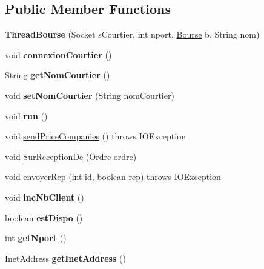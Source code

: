 \subsection*{Public Member Functions}
\begin{DoxyCompactItemize}
\item 
\mbox{\label{classcom_1_1m1sar_1_1_thread_bourse_ac083c16dd85a59f19f3ea1728d32e057}} 
{\bfseries Thread\+Bourse} (Socket s\+Courtier, int nport, \hyperlink{classcom_1_1m1sar_1_1_bourse}{Bourse} b, String nom)
\item 
\mbox{\label{classcom_1_1m1sar_1_1_thread_bourse_ac052e73112ac20e1c2e6fa3f7c9bce94}} 
void {\bfseries connexion\+Courtier} ()
\item 
\mbox{\label{classcom_1_1m1sar_1_1_thread_bourse_adfc535a296af8c294920dadf497a928b}} 
String {\bfseries get\+Nom\+Courtier} ()
\item 
\mbox{\label{classcom_1_1m1sar_1_1_thread_bourse_aa7c0c87d2fb28b192bf812ae0654d596}} 
void {\bfseries set\+Nom\+Courtier} (String nom\+Courtier)
\item 
\mbox{\label{classcom_1_1m1sar_1_1_thread_bourse_a5d851ffad404a8c62a3175f222ce410f}} 
void {\bfseries run} ()
\item 
void \hyperlink{classcom_1_1m1sar_1_1_thread_bourse_acea1b4e4e2757b3cc82bba756eda4057}{send\+Price\+Companies} ()  throws I\+O\+Exception 
\item 
void \hyperlink{classcom_1_1m1sar_1_1_thread_bourse_a714db4602cd1dff9a732caf861b1d5e6}{Sur\+Reception\+De} (\hyperlink{classcom_1_1m1sar_1_1_ordre}{Ordre} ordre)
\item 
void \hyperlink{classcom_1_1m1sar_1_1_thread_bourse_a431e283fa57268481834f67709b7ec07}{envoyer\+Rep} (int id, boolean rep)  throws I\+O\+Exception 
\item 
\mbox{\label{classcom_1_1m1sar_1_1_thread_bourse_a7fe473194bcccaa0aa31b8f0e816834b}} 
void {\bfseries inc\+Nb\+Client} ()
\item 
\mbox{\label{classcom_1_1m1sar_1_1_thread_bourse_a2b4318d2553102b0421c5616a7ef93e9}} 
boolean {\bfseries est\+Dispo} ()
\item 
\mbox{\label{classcom_1_1m1sar_1_1_thread_bourse_aa9a44f7d1cd2d2cfce8520270b2cd7f8}} 
int {\bfseries get\+Nport} ()
\item 
\mbox{\label{classcom_1_1m1sar_1_1_thread_bourse_a54c11ec3c4ecf3235a66e457ba464c39}} 
Inet\+Address {\bfseries get\+Inet\+Address} ()
\end{DoxyCompactItemize}


